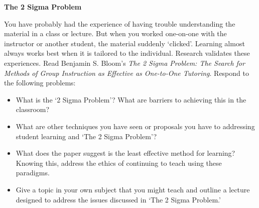 \documentclass[11pt,letterpaper]{article}
\begin{document}

\begin{center} {\Large \bfseries The 2 Sigma Problem} \end{center}

You have probably had the experience of having trouble understanding the material in a class or lecture. But when you worked one-on-one with the instructor or another student, the material suddenly `clicked'. Learning almost always works best when it is tailored to the individual. Research validates these experiences. Read Benjamin S. Bloom's \textit{The 2 Sigma Problem: The Search for Methods of Group Instruction as Effective as One-to-One Tutoring}. Respond to the following problems:
	\begin{itemize}
	\item What is the `2 Sigma Problem'? What are barriers to achieving this in the classroom?
	\item What are other techniques you have seen or proposals you have to addressing student learning and `The 2 Sigma Problem'? 
	\item What does the paper suggest is the least effective method for learning? Knowing this, address the ethics of continuing to teach using these paradigms. 
	\item Give a topic in your own subject that you might teach and outline a lecture designed to address the issues discussed in `The 2 Sigma Problem.' 
	\end{itemize}

\newpage

\phantom{.}
\end{document}
